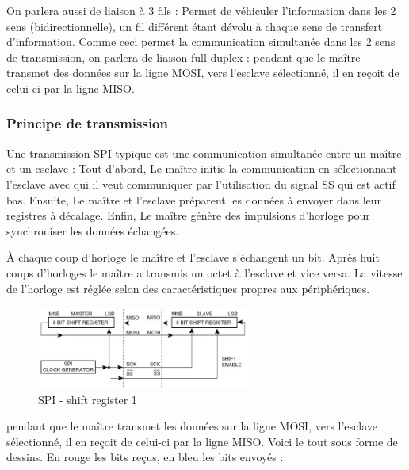\documentclass[french,a4paper,12pt]{report}
\begin{document}
	On parlera aussi de liaison à 3 fils : Permet de véhiculer l’information dans les 2 sens (bidirectionnelle), un fil différent étant dévolu à chaque sens de transfert d’information. Comme ceci permet la communication simultanée dans les 2 sens de transmission, on parlera de liaison full-duplex : pendant que le maître transmet des données sur la ligne MOSI, vers l’esclave sélectionné, il en reçoit de celui-ci par la ligne MISO.

  		\subsubsection{Principe de transmission}
  		
			Une transmission SPI typique est une communication simultanée entre un maître et un esclave :
Tout d'abord, Le maître initie la communication en sélectionnant l'esclave avec qui il veut communiquer par l'utilisation du signal SS qui est actif bas.
Ensuite, Le maître et l'esclave préparent les données à envoyer dans leur registres à décalage.
Enfin, Le maître génère des impulsions d'horloge pour synchroniser les données échangées.
 
À chaque coup d'horloge le maître et l'esclave s'échangent un bit. Après huit coups d'horloges le maître a transmis un octet à l'esclave et vice versa. La vitesse de l'horloge est réglée selon des caractéristiques propres aux périphériques.

	\begin{figure}[!ht]
    \center
  	\includegraphics[width=7cm]{SPI3.png}
    \caption{SPI - shift register 1}
	\end{figure}
 
pendant que le maître transmet les données sur la ligne MOSI, vers l’esclave sélectionné, il en reçoit de celui-ci par la ligne MISO.
Voici le tout sous forme de dessins. En rouge les bits reçus, en bleu les bits envoyés :
\end{document}
